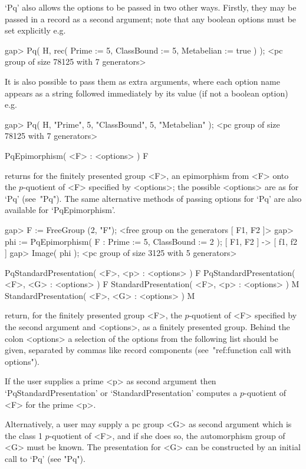 `Pq' also allows the options to be passed in  two  other  ways.  Firstly,
they may be passed in a record  as  a  second  argument;  note  that  any
boolean options must be set explicitly e.g.

\beginexample
gap> Pq( H, rec( Prime := 5, ClassBound := 5, Metabelian := true ) );
<pc group of size 78125 with 7 generators>
\endexample

It is also possible to pass them as extra arguments, where each option
name appears as a string followed immediately by its value (if not a
boolean option) e.g.

\beginexample
gap> Pq( H, "Prime", 5, "ClassBound", 5, "Metabelian" );             
<pc group of size 78125 with 7 generators>
\endexample

\>PqEpimorphism( <F> : <options> ) F

returns for the finitely presented group <F>,  an  epimorphism  from  <F>
onto the  $p$-quotient  of  <F>  specified  by  <options>;  the  possible
<options> are as for `Pq' (see~"Pq"). The  same  alternative  methods  of
passing options for `Pq' are also available for `PqEpimorphism'.

\beginexample
gap> F := FreeGroup (2, "F");
<free group on the generators [ F1, F2 ]>
gap> phi := PqEpimorphism( F : Prime := 5, ClassBound := 2 );
[ F1, F2 ] -> [ f1, f2 ]
gap> Image( phi );
<pc group of size 3125 with 5 generators>
\endexample


\>PqStandardPresentation( <F>, <p> : <options> ) F
\>PqStandardPresentation( <F>, <G> : <options> ) F
\>StandardPresentation( <F>, <p> : <options> ) M
\>StandardPresentation( <F>, <G> : <options> ) M

return, for the finitely presented group <F>,  the  $p$-quotient  of  <F>
specified by the second argument and <options>, as a  finitely  presented
group. Behind the colon <options> a selection of  the  options  from  the
following  list  should  be  given,  separated  by  commas  like   record
components (see~"ref:function call with options").

If  the  user  supplies   a   prime   <p>   as   second   argument   then
`PqStandardPresentation'    or    `StandardPresentation'    computes    a
$p$-quotient of <F> for the prime <p>.

Alternatively, a user may supply a pc group <G> as second argument  which
is the class 1 $p$-quotient of <F>, and if she does so, the  automorphism
group of <G> must be known. The presentation for <G> can  be  constructed
by an initial call to `Pq' (see "Pq").

